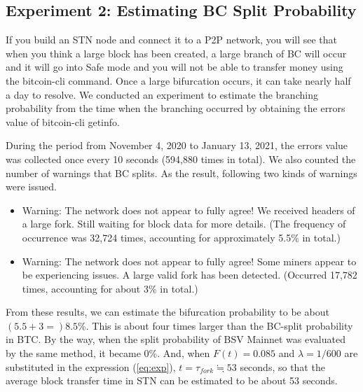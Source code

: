 \documentclass[graybox]{svmult}
\begin{document}
\subsection{Experiment 2: Estimating BC Split Probability}
\label{sec:sork}

If you build an STN node and connect it to a P2P network, you will see that when you think a large block has been created, a large branch of BC will occur and it will go into Safe mode and you will not be able to transfer money using the bitcoin-cli command.
Once a large bifurcation occurs, it can take nearly half a day to resolve.
We conducted an experiment to estimate the branching probability from the time when the branching occurred by obtaining the errors value of bitcoin-cli getinfo.


During the period from November 4, 2020 to January 13, 2021, the errors value was collected once every 10 seconds (594,880 times in total).
We also counted the number of warnings that BC splits.
As the result, following two kinds of warnings were issued.
%
\begin{itemize}
  \item Warning: The network does not appear to fully agree! We received
        headers of a large fork. Still waiting for block data for more details.
	(The frequency of occurrence was 32,724 times, accounting for approximately 5.5\% in total.)

  \item Warning: The network does not appear to fully agree! Some miners
        appear to be experiencing issues. A large valid fork has been detected. 
	(Occurred 17,782 times, accounting for about 3\% in total.)
\end{itemize}
%
From these results, we can estimate the bifurcation probability to be about $(5.5 + 3 =) 8.5$\%.
This is about four times larger than the BC-split probability in BTC. 
By the way, when the split probability of BSV Mainnet was evaluated by the same method, it became 0\%.
And, when $F(t) = 0.085$ and $\lambda = 1/600$ are substituted in the expression (\ref{eq:exp}), $t = \tau_{fork} \fallingdotseq 53$ seconds, so that the average block transfer time in STN can be estimated to be about 53 seconds.
\end{document}

